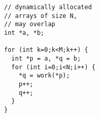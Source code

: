 \begin{lstlisting}[morekeywords={g_qCount},belowskip=0pt]
// dynamically allocated
// arrays of size N,
// may overlap
int *a, *b;

for (int k=0;k<M;k++) {
  int *p = a, *q = b;
  for (int i=0;i<N;i++) {
    *q = work(*p);
    p++;
    q++;
  }
}
\end{lstlisting}

